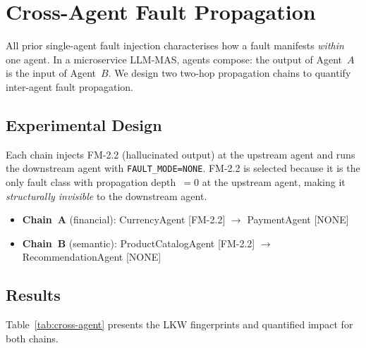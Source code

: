\documentclass[conference]{IEEEtran}
\begin{document}
\FloatBarrier  %
\section{Cross-Agent Fault Propagation}
\label{sec:cross-agent}

All prior single-agent fault injection characterises how a fault manifests
\emph{within} one agent. In a microservice LLM-MAS, agents compose: the output
of Agent~$A$ is the input of Agent~$B$. We design two two-hop propagation
chains to quantify inter-agent fault propagation.

\subsection{Experimental Design}

Each chain injects FM-2.2 (hallucinated output) at the upstream agent and runs
the downstream agent with \texttt{FAULT\_MODE=NONE}. FM-2.2 is selected because
it is the only fault class with propagation depth~$= 0$ at the upstream agent,
making it \emph{structurally invisible} to the downstream agent.

\begin{itemize}
  \item \textbf{Chain~A} (financial): CurrencyAgent [FM-2.2]
        $\rightarrow$ PaymentAgent [NONE]
  \item \textbf{Chain~B} (semantic): ProductCatalogAgent [FM-2.2]
        $\rightarrow$ RecommendationAgent [NONE]
\end{itemize}

\subsection{Results}

Table~\ref{tab:cross-agent} presents the LKW fingerprints and quantified impact
for both chains.
\end{document}
